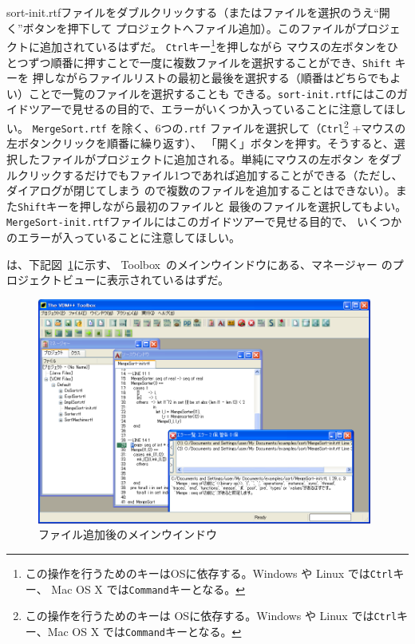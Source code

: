 \documentclass[\pformat,12pt]{jarticle}
\newcommand{\Toolbox}{Toolbox}
\newcommand{\cmd}{\tt }
\newcommand{\guicmd}[1]{{\gt #1}}
\begin{document}
{%
sort-init.rtfファイルをダブルクリックする（またはファイルを選択のうえ``\guicmd{開く}''ボタンを押下して
プロジェクトへファイル追加）。このファイルがプロジェクトに追加されているはずだ。
{\cmd Ctrl}キー\footnote{この操作を行うためのキーはOSに依存する。Windows や Linux では{\cmd Ctrl}キー、
Mac OS X では{\cmd Command}キーとなる。}を押しながら
マウスの左ボタンをひとつずつ順番に押すことで一度に複数ファイルを選択することができ、{\cmd Shift} キーを
押しながらファイルリストの最初と最後を選択する（順番はどちらでもよい）ことで一覧のファイルを選択することも
できる。{\tt sort-init.rtf}にはこのガイドツアーで見せるの目的で、エラーがいくつか入っていることに注意してほしい。
}
{%
{\tt MergeSort.rtf} を除く、6つの{\tt .rtf} ファイルを選択して（{\cmd Ctrl}\footnote{この操作を行うためのキーは
OSに依存する。Windows や Linux では{\cmd Ctrl}キー、Mac OS X では{\cmd Command}キーとなる。}
 +マウスの左ボタンクリックを順番に繰り返す）、
「開く」ボタンを押す。そうすると、選択したファイルがプロジェクトに追加される。単純にマウスの左ボタン
をダブルクリックするだけでもファイル1つであれば追加することができる（ただし、ダイアログが閉じてしまう
ので複数のファイルを追加することはできない）。また{\cmd Shift}キーを押しながら最初のファイルと
最後のファイルを選択してもよい。{\tt MergeSort-init.rtf}ファイルにはこのガイドツアーで見せる目的で、
いくつかのエラーが入っていることに注意してほしい。
}

は、下記図~\ref{fig:addedfiles}に示す、
\Toolbox\ のメインウインドウにある、\guicmd{マネージャー} の\guicmd{プロジェクトビュー}に表示されているはずだ。

\begin{figure}[tbh]
\begin{center}
\includegraphics[width=11cm]{addedFiles-pp.png}
\caption{ファイル追加後のメインウインドウ}
\label{fig:addedfiles}
\end{center}
\end{figure}
\end{document}
